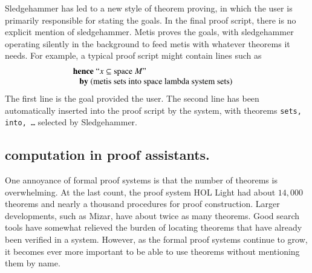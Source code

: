 \documentclass{llncs}
\begin{document}

Sledgehammer has led to a new style of theorem proving, in which the
user is primarily responsible for stating the goals.  In the final
proof script, there is no explicit mention of sledgehammer.  Metis
proves the goals, with sledgehammer operating silently in the
background to feed metis with whatever theorems it needs.
For example, a typical proof script might contain  lines such as \cite{Paar}
\[
\begin{array}{ll}
\text{{\bf hence} ``$x \subseteq \text{space}~M$''}\\
\text{~~~{\bf by} (metis sets into space lambda system sets)}&
\end{array}
\]
The first line is the goal provided the user. The second line has been
automatically inserted into the proof script by the system, with
theorems {\tt sets, into, \dots} selected by Sledgehammer.






\subsection{computation in proof assistants.}

One annoyance of formal proof systems is that the number of theorems
is overwhelming.   At the last count, the proof system HOL Light had about $14,000$
theorems and nearly a thousand procedures for proof construction.
Larger developments, such as Mizar, have about twice as many theorems.
Good search tools have somewhat relieved the burden of locating theorems
that have already been verified in a system.  However, as the formal proof
systems continue to grow, it becomes ever more important to be able to 
use theorems without mentioning them by name.


\end{document}
